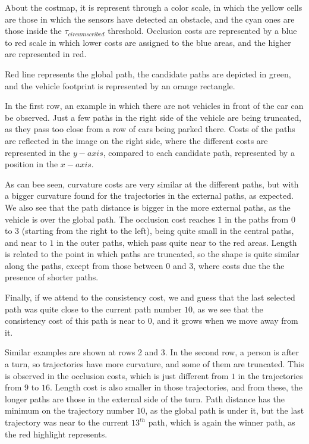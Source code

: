 About the costmap, it is represent through a color scale, in which the yellow cells are those in which the sensors have detected an obstacle, and the cyan ones are those inside the $\tau_{circumscribed}$ threshold. Occlusion costs are represented by a blue to red scale in which lower costs are assigned to the blue areas, and the higher are represented in red.

Red line represents the global path, the candidate paths are depicted in green, and the vehicle footprint is represented by an orange rectangle.

In the first row, an example in which there are not vehicles in front of the car can be observed. Just a few paths in the right side of the vehicle are being truncated, as they pass too close from a row of cars being parked there. Costs of the paths are reflected in the image on the right side, where the different costs are represented in the $y-axis$, compared to each candidate path, represented by a position in the $x-axis$. 

As can bee seen, curvature costs are very similar at the different paths, but with a bigger curvature found for the trajectories in the external paths, as expected. We also see that the path distance is bigger in the more external paths, as the vehicle is over the global path. The occlusion cost reaches $1$ in the paths from $0$ to $3$ (starting from the right to the left), being quite small in the central paths, and near to $1$ in the outer paths, which pass quite near to the red areas. Length is related to the point in which paths are truncated, so the shape is quite similar along the paths, except from those between $0$ and $3$, where costs due the the presence of shorter paths.

Finally, if we attend to the consistency cost, we and guess that the last selected path was quite close to the current path number $10$, as we see that the consistency cost of this path is near to $0$, and it grows when we move away from it.

Similar examples are shown at rows 2 and 3. In the second row, a person is after a turn, so trajectories have more curvature, and some of them are truncated. This is observed in the occlusion costs, which is just different from $1$ in the trajectories from $9$ to $16$. Length cost is also smaller in those trajectories, and from these, the longer paths are those in the external side of the turn. Path distance has the minimum on the trajectory number $10$, as the global path is under it, but the last trajectory was near to the current $13^{th}$ path, which is again the winner path, as the red highlight represents.

